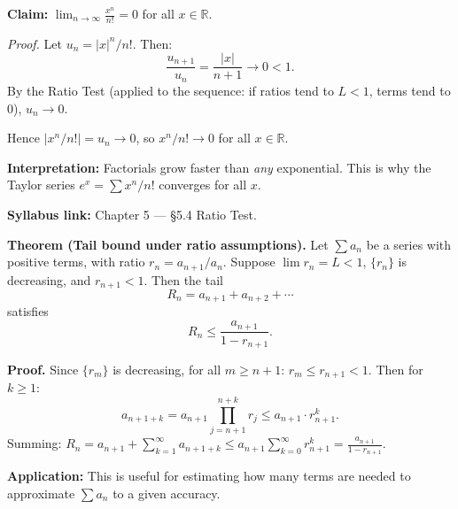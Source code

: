 \begin{examplebox}[title={Worked Example (Tutorial 10, Q3): $\lim_{n\to\infty}x^n/n!=0$ via Ratio Test}]
\textbf{Claim:} $\displaystyle\lim_{n\to\infty}\frac{x^n}{n!}=0$ for all $x\in\mathbb{R}$.

\emph{Proof.}
Let $u_n=|x|^n/n!$. Then:
\[
\frac{u_{n+1}}{u_n}=\frac{|x|}{n+1}\to 0<1.
\]
By the Ratio Test (applied to the sequence: if ratios tend to $L<1$, terms tend to $0$), $u_n\to 0$.

Hence $|x^n/n!|=u_n\to 0$, so $\boxed{x^n/n!\to 0}$ for all $x\in\mathbb{R}$.

\textbf{Interpretation:} Factorials grow faster than \emph{any} exponential. This is why the Taylor series $e^x=\sum x^n/n!$ converges for all $x$.
\end{examplebox}

\begin{extension}[title={Extension (Tutorial 10, Q5): Bounding the remainder of a convergent series}]
\textbf{Syllabus link:} Chapter 5 --- \S5.4 Ratio Test.

\medskip
\textbf{Theorem (Tail bound under ratio assumptions).}
Let $\sum a_n$ be a series with positive terms, with ratio $r_n=a_{n+1}/a_n$.
Suppose $\lim r_n=L<1$, $\{r_n\}$ is decreasing, and $r_{n+1}<1$. Then the tail
\[
R_n=a_{n+1}+a_{n+2}+\cdots
\]
satisfies
\[
R_n\le \frac{a_{n+1}}{1-r_{n+1}}.
\]

\medskip
\textbf{Proof.}
Since $\{r_m\}$ is decreasing, for all $m\ge n+1$: $r_m\le r_{n+1}<1$.
Then for $k\ge 1$:
\[
a_{n+1+k}=a_{n+1}\prod_{j=n+1}^{n+k}r_j\le a_{n+1}\cdot r_{n+1}^k.
\]
Summing:
$R_n=a_{n+1}+\sum_{k=1}^{\infty}a_{n+1+k}\le a_{n+1}\sum_{k=0}^{\infty}r_{n+1}^k=\frac{a_{n+1}}{1-r_{n+1}}$.

\medskip
\textbf{Application:}
This is useful for estimating how many terms are needed to approximate $\sum a_n$ to a given accuracy.
\end{extension}

